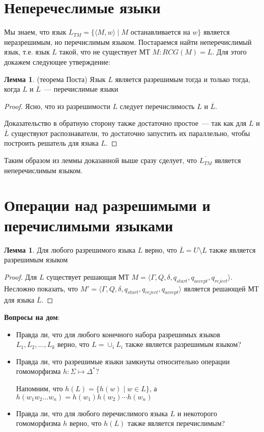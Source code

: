 \documentclass[
    11pt,
    a4paper
]{article}
\theoremstyle{definition}
\newtheorem{lemma}[theorem]{Лемма}
\begin{document}
\section{Неперечеслимые языки}

Мы знаем, что язык $L_{TM} = \{ \langle M, w \rangle \mid M \textit { останавливается на } w\}$ является неразрешимым, но перечислимым языком. Постараемся найти неперечислимый язык, т.е. язык $L$ такой, что не существует МТ $M: RCG(M) = L$. Для этого докажем следующее утверждение:
\begin{lemma}{(теорема Поста)}
Язык $L$ является разрешимым тогда и только тогда, когда $L$ и $\overline{L}$~--- перечислимые языки
\end{lemma}
\begin{proof}
Ясно, что из разрешимости $L$ следует перечислимость $L$ и $\overline{L}$.

Доказательство в обратную сторону также достаточно простое~--- так как для $L$ и $\overline{L}$ существуют распознаватели, то достаточно запустить их параллельно, чтобы построить решатель для языка $L$.
\end{proof}

Таким образом из леммы доказанной выше сразу сделует, что $\overline{L_{TM}}$ является неперечислимым языком.

\section{Операции над разрешимыми и перечислимыми языками}

\begin{lemma}
Для любого разрешимого языка $L$ верно, что $\overline{L} = U \setminus L$ также является разрешимым языком
\end{lemma}
\begin{proof}
Для $L$ существует решающая МТ $M = \langle \Gamma, Q, \delta, q_{start}, q_{accept}, q_{reject} \rangle$. Несложно показать, что $M' = \langle \Gamma, Q, \delta, q_{start}, q_{reject}, q_{accept} \rangle$ является решающей МТ для языка $\overline{L}$.
\end{proof}

\textbf{Вопросы на дом}:
\begin{itemize}
\item Правда ли, что для любого конечного набора разрешимых языков $L_1, L_2, \dots, L_k$ верно, что $L = \cup_i L_{i}$ также является разрешимым языком?
\item Правда ли, что разрешимые языки замкнуты относительно операции гомоморфизма $h: \Sigma \mapsto \Delta^*$?

Напомним, что $h(L) = \{ h(w) \mid w \in L \}$, а $h(w_1w_2\ldots w_n) = h(w_1) h(w_2) \cdots h(w_n)$
\item Правда ли, что для любого перечислимого языка $L$ и некоторого гомоморфизма $h$ верно, что $h(L)$ также является перечислимым?
\end{itemize}
\end{document}
